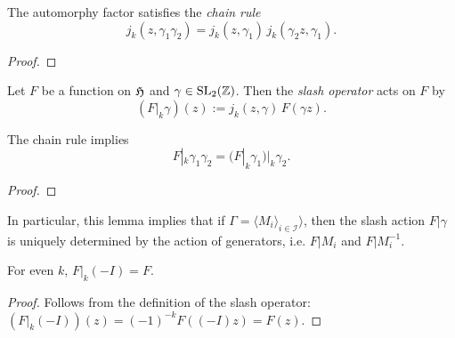 \begin{lemma}\label{lemma:automorphy-factor-chain-rule}\leanok {}
    The automorphy factor satisfies the \emph{chain rule}
$$j_k(z,\gamma_1\gamma_2)=j_k(z,\gamma_1)\,j_k(\gamma_2z,\gamma_1). $$
\end{lemma}
\begin{proof}
    \leanok
\end{proof}

\begin{definition}\label{def:slash-operator}\leanok
    Let $F$ be a function on $\mathfrak{H}$ and $\gamma\in\mathrm{SL}_2(\mathbb{Z})$. Then the \emph{slash operator} acts on $F$ by
$$(F|_k\gamma)(z):=j_k(z,\gamma)\,F(\gamma z). $$
\end{definition}

\begin{lemma}\label{lemma:slash-operator-chain-rule}\leanok
  The chain rule implies $$F|_k\gamma_1\gamma_2=(F|_k\gamma_1)|_k\gamma_2.$$
\end{lemma}
\begin{proof}
    \leanok
\end{proof}

In particular, this lemma implies that if $\Gamma = \langle M_i \rangle_{i \in \mathcal{I}} \rangle$, then the slash action $F|\gamma$ is uniquely determined by the action of generators, i.e. $F|M_i$ and $F|M_i^{-1}$.

\begin{lemma}\label{lemma:slash-negI-even-weight}\leanok
   For even $k$, $F|_{k}(-I) = F$.
\end{lemma}
\begin{proof}
    \leanok
Follows from the definition of the slash operator:
$(F|_{k}(-I))(z) = (-1)^{-k}F((-I)z) = F(z)$.
\end{proof}

